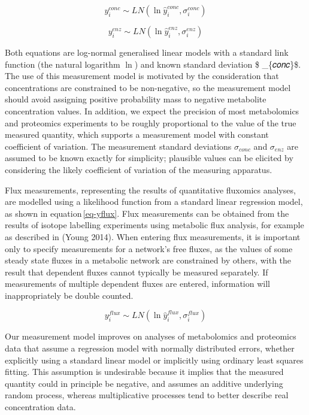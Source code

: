 \documentclass[journal=,manuscript=]{achemso}
\begin{document}
\begin{equation}
y_i^{conc} \sim LN(\ln{\hat{y}_i^{conc}}, \sigma_i^{conc})\label{eq-yconc}
\end{equation}

\begin{equation}
y_i^{enz} \sim LN(\ln{\hat{y}_i^{enz}}, \sigma_i^{enz})\label{eq-yenz}
\end{equation}

Both equations are log-normal generalised linear models with a standard
link function (the natural logarithm \(\ln\)) and known standard
deviation \$ \sigma\_\{𝑐𝑜𝑛𝑐\}\$. The use of this measurement model is
motivated by the consideration that concentrations are constrained to be
non-negative, so the measurement model should avoid assigning positive
probability mass to negative metabolite concentration values. In
addition, we expect the precision of most metabolomics and proteomics
experiments to be roughly proportional to the value of the true measured
quantity, which supports a measurement model with constant coefficient
of variation. The measurement standard deviations \(\sigma_{𝑐𝑜𝑛𝑐}\) and
\(\sigma_{𝑒𝑛𝑧}\) are assumed to be known exactly for simplicity;
plausible values can be elicited by considering the likely coefficient
of variation of the measuring apparatus.

Flux measurements, representing the results of quantitative fluxomics
analyses, are modelled using a likelihood function from a standard
linear regression model, as shown in equation\,\eqref{eq-yflux}. Flux
measurements can be obtained from the results of isotope labelling
experiments using metabolic flux analysis, for example as described in
(Young 2014). When entering flux measurements, it is important only to
specify measurements for a network's free fluxes, as the values of some
steady state fluxes in a metabolic network are constrained by others,
with the result that dependent fluxes cannot typically be measured
separately. If measurements of multiple dependent fluxes are entered,
information will inappropriately be double counted.

\begin{equation}
y_i^{flux} \sim LN(\ln{\hat{y}_i^{flux}}, \sigma_i^{flux})\label{eq-yflux}
\end{equation}

Our measurement model improves on analyses of metabolomics and
proteomics data that assume a regression model with normally distributed
errors, whether explicitly using a standard linear model or implicitly
using ordinary least squares fitting. This assumption is undesirable
because it implies that the measured quantity could in principle be
negative, and assumes an additive underlying random process, whereas
multiplicative processes tend to better describe real concentration
data.
\end{document}
